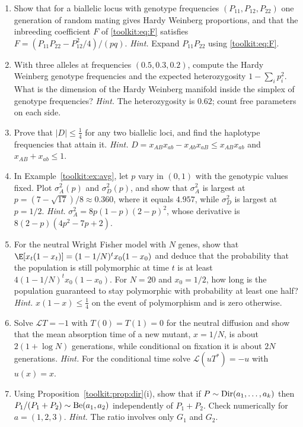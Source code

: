 \begin{enumerate}[label=\arabic*.,leftmargin=*,itemsep=4pt]
\item Show that for a biallelic locus with genotype frequencies $(P_{11},P_{12},P_{22})$ one
generation of random mating gives Hardy Weinberg proportions, and that the inbreeding coefficient
$F$ of \eqref{toolkit:eq:F} satisfies $F=(P_{11}P_{22}-P_{12}^2/4)/(pq)$.
\emph{Hint.} Expand $P_{11}P_{22}$ using \eqref{toolkit:eq:F}.

\item With three alleles at frequencies $(0.5,0.3,0.2)$, compute the Hardy Weinberg genotype
frequencies and the expected heterozygosity $1-\sum_ip_i^2$. What is the dimension of the
Hardy Weinberg manifold inside the simplex of genotype frequencies?
\emph{Hint.} The heterozygosity is $0.62$; count free parameters on each side.

\item Prove that $|D|\le\tfrac14$ for any two biallelic loci, and find the haplotype frequencies
that attain it. \emph{Hint.} $D=x_{AB}x_{ab}-x_{Ab}x_{aB}\le x_{AB}x_{ab}$ and
$x_{AB}+x_{ab}\le1$.

\item In Example~\ref{toolkit:ex:avg}, let $p$ vary in $(0,1)$ with the genotypic values fixed.
Plot $\sigma^2_A(p)$ and $\sigma^2_D(p)$, and show that $\sigma^2_A$ is largest at
$p=(7-\sqrt{17})/8\approx0.360$, where it equals $4.957$, while $\sigma^2_D$ is largest at $p=1/2$.
\emph{Hint.} $\sigma^2_A=8p(1-p)(2-p)^2$, whose derivative is $8(2-p)(4p^2-7p+2)$.

\item For the neutral Wright Fisher model with $N$ genes, show that
$\E[x_t(1-x_t)]=(1-1/N)^tx_0(1-x_0)$ and deduce that the probability that the population is still
polymorphic at time $t$ is at least $4(1-1/N)^tx_0(1-x_0)$. For $N=20$ and $x_0=1/2$, how
long is the population guaranteed to stay polymorphic with probability at least one half?
\emph{Hint.} $x(1-x)\le\tfrac14$ on the event of polymorphism and is zero otherwise.

\item Solve $\mathcal{L}T=-1$ with $T(0)=T(1)=0$ for the neutral diffusion and show that the mean
absorption time of a new mutant, $x=1/N$, is about $2(1+\log N)$ generations, while conditional
on fixation it is about $2N$ generations. \emph{Hint.} For the conditional time solve
$\mathcal{L}(uT^*)=-u$ with $u(x)=x$.

\item Using Proposition~\ref{toolkit:prop:dir}(i), show that if $P\sim\mathrm{Dir}(a_1,\dots,a_k)$ then
$P_1/(P_1+P_2)\sim\mathrm{Be}(a_1,a_2)$ independently of $P_1+P_2$. Check numerically for $a=(1,2,3)$.
\emph{Hint.} The ratio involves only $G_1$ and $G_2$.


\end{enumerate}
